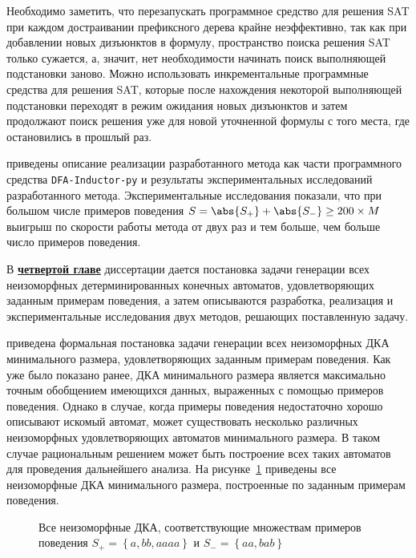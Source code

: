 Необходимо заметить, что перезапускать программное средство для решения SAT при каждом достраивании префиксного дерева крайне неэффективно, так как при добавлении новых дизъюнктов в формулу, пространство поиска решения SAT только сужается, а, значит, нет необходимости начинать поиск выполняющей подстановки заново.
Можно использовать инкрементальные программные средства для решения SAT, которые после нахождения некоторой выполняющей подстановки переходят в режим ожидания новых дизъюнктов и затем продолжают поиск решения уже для новой уточненной формулы с того места, где остановились в прошлый раз.

\insection{\ref{sec:cegar:results}} приведены описание реализации разработанного метода как части программного средства \texttt{DFA-Inductor-py} и результаты экспериментальных исследований разработанного метода. Экспериментальные исследования показали, что при большом числе примеров поведения $S=\abs{S_{+}}+\abs{S_{-}} \geq 200 \times M$ выигрыш по скорости работы метода от двух раз и тем больше, чем больше число примеров поведения.


В \textbf{\underline{четвертой главе}} диссертации дается постановка задачи генерации всех неизоморфных детерминированных конечных автоматов, удовлетворяющих заданным примерам поведения, а затем описываются разработка, реализация и экспериментальные исследования двух методов, решающих поставленную задачу. 

\insection{\ref{sec:findall:problem}} приведена формальная постановка задачи генерации всех неизоморфных ДКА минимального размера, удовлетворяющих заданным примерам поведения.
Как уже было показано ранее, ДКА минимального размера является максимально точным обобщением имеющихся данных, выраженных с помощью примеров поведения.
Однако в случае, когда примеры поведения недостаточно хорошо описывают искомый автомат, может существовать несколько различных неизоморфных удовлетворяющих автоматов минимального размера.
В таком случае рациональным решением может быть построение всех таких автоматов для проведения дальнейшего анализа.
На рисунке~\ref{syn:img:find-all} приведены все неизоморфные ДКА минимального размера, построенные по заданным примерам поведения.
%
\begin{figure}[ht]
  \centering
  \scalebox{0.8}{}
  \caption{Все неизоморфные ДКА, соответствующие множествам примеров поведения $S_{+} = \left\{a, bb, aaaa\right\}$ и $S_{-}=\left\{aa, bab\right\}$}
  \label{syn:img:find-all}
\end{figure}

